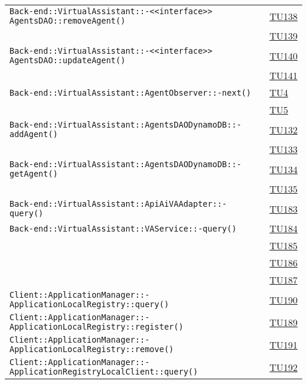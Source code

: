 \begin{longtable}{|>{\centering}m{12cm}|m{1cm}<{\centering}|}
\texttt{Back-end::VirtualAssistant::-\linebreak <<interface>> AgentsDAO::removeAgent()} & \hyperlink{TU138}{TU138}\\ & \hyperlink{TU139}{TU139}\\ \hline
\texttt{Back-end::VirtualAssistant::-\linebreak <<interface>> AgentsDAO::updateAgent()} & \hyperlink{TU140}{TU140}\\ & \hyperlink{TU141}{TU141}\\ \hline
\texttt{Back-end::VirtualAssistant::AgentObserver::-\linebreak next()} & \hyperlink{TU4}{TU4}\\ & \hyperlink{TU5}{TU5}\\ \hline
\texttt{Back-end::VirtualAssistant::AgentsDAODynamoDB::-\linebreak addAgent()} & \hyperlink{TU132}{TU132}\\ & \hyperlink{TU133}{TU133}\\ \hline
\texttt{Back-end::VirtualAssistant::AgentsDAODynamoDB::-\linebreak getAgent()} & \hyperlink{TU134}{TU134}\\ & \hyperlink{TU135}{TU135}\\ \hline
\texttt{Back-end::VirtualAssistant::ApiAiVAAdapter::-\linebreak query()} & \hyperlink{TU183}{TU183}\\ \hline
\texttt{Back-end::VirtualAssistant::VAService::-\linebreak query()} & \hyperlink{TU184}{TU184}\\ & \hyperlink{TU185}{TU185}\\ & \hyperlink{TU186}{TU186}\\ & \hyperlink{TU187}{TU187}\\ \hline
\texttt{Client::ApplicationManager::-\linebreak ApplicationLocalRegistry::query()} & \hyperlink{TU190}{TU190}\\ \hline
\texttt{Client::ApplicationManager::-\linebreak ApplicationLocalRegistry::register()} & \hyperlink{TU189}{TU189}\\ \hline
\texttt{Client::ApplicationManager::-\linebreak ApplicationLocalRegistry::remove()} & \hyperlink{TU191}{TU191}\\ \hline
\texttt{Client::ApplicationManager::-\linebreak ApplicationRegistryLocalClient::query()} & \hyperlink{TU192}{TU192}\\ \hline

\end{longtable}
